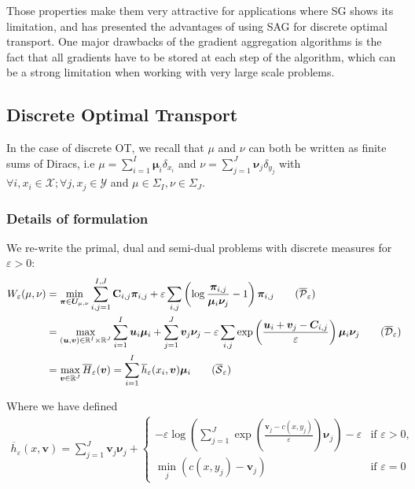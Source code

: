 Those properties make them very attractive for applications where SG shows its limitation, and \cite{genevay_stochastic_2016} has presented the advantages of using SAG for discrete optimal transport. One major drawbacks of the gradient aggregation algorithms is the fact that all gradients have to be stored at each step of the algorithm, which can be a  strong limitation when working with very large scale problems.

\subsection{Discrete Optimal Transport}

In the case of discrete OT, we recall that $\mu$ and $\nu$ can both be written as finite sums of Diracs, i.e $\mu = \sum_{i=1}^I \mathbf{\mu}_i \delta_{x_i}$ and $\nu = \sum_{j=1}^J \mathbf{\nu}_j \delta_{y_j}$ with $\forall i, x_i \in \mathcal{X} ; \forall j, x_j \in \mathcal{Y}$ and $\mu \in \Sigma_I, \nu \in \Sigma_J$.

\subsubsection{Details of formulation}

We re-write the primal, dual and semi-dual problems with discrete measures for $\varepsilon > 0$: 
\begin{align*}
    W_\varepsilon(\mu, \nu) &= \min_{\bm{\pi}\in \bm{U}_{\mu, \nu}} \sum_{i,j=1}^{I, J}\mathbf{C}_{i,j} \bm{\pi}_{i,j} + \varepsilon\sum_{i,j}\left( \log\dfrac{\bm{\pi}_{i,j}}{\bm{\mu}_i\bm{\nu}_j}-1 \right)\bm{\pi}_{i,j} \tag{$\overline{\mathcal{P}}_\varepsilon$} \\
    &= \max_{(\bm{u}, \bm{v})\in \mathbb{R}^{I}\times\mathbb{R}^{J}} \sum_{i=1}^I \bm{u}_i \bm{\mu}_i + \sum_{j=1}^J \bm{v}_j \bm{\nu}_j - \varepsilon \sum_{i,j}\exp\left( \frac{\bm{u}_i+\bm{v}_j - \bm{C}_{i,j}}{\varepsilon} \right)\bm{\mu}_i\bm{\nu}_j \tag{$\overline{\mathcal{D}}_\varepsilon$}\\
    &= \max_{\bm{v}\in \mathbb{R}^{J}} \overline{H}_\varepsilon(\bm{v}) = \sum_{i=1}^I \overline{h}_\varepsilon(x_i, \bm{v})\bm{\mu}_i \tag{$\overline{\mathcal{S}}_\varepsilon$} \label{eq:semi-dual-discrete}
\end{align*}

Where we have defined 
\begin{align*}
    \overline{h}_\varepsilon(x, \bm{v}) = \sum_{j=1}^J \bm{v}_j \bm{\nu}_j + 
    \begin{cases}
        -\varepsilon\log\left( \sum_{j=1}^J \exp\left(\frac{\bm{v}_j - c(x, y_j)}{\varepsilon}\right)\bm{\nu}_j \right) - \varepsilon & \text{if }\varepsilon > 0,\\
        \min_j (c(x, y_j) - \bm{v}_j) & \text{if }\varepsilon = 0
    \end{cases}
\end{align*}

